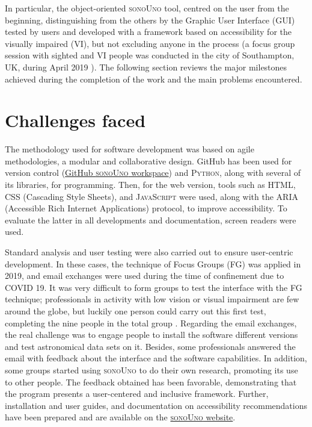 \documentclass[baaa]{baaa}
\begin{document}
In particular, the object-oriented \textsc{sonoUno} tool, centred on the user from the beginning, distinguishing from the others by the Graphic User Interface (GUI) tested by users and developed with a framework based on accessibility for the visually impaired (VI), but not excluding anyone in the process (a focus group session with sighted and VI people was conducted in the city of Southampton, UK, during April 2019 \citep{casadoFG2022}). The following section reviews the major milestones achieved during the completion of the work and the main problems encountered.

\section{Challenges faced}

The methodology used for software development was based on agile methodologies, a modular and collaborative design. GitHub has been used for version control (\href{https://github.com/sonoUnoTeam}{GitHub \textsc{sonoUno} workspace}) and \textsc{Python}, along with several of its libraries, for programming. Then, for the web version, tools such as \textsc{HTML}, \textsc{CSS} (Cascading Style Sheets), and \textsc{JavaScript} were used, along with the \textsc{ARIA} (Accessible Rich Internet Applications) protocol, to improve accessibility. To evaluate the latter in all developments and documentation, screen readers were used.

Standard analysis and user testing were also carried out to ensure user-centric development. In these cases, the technique of Focus Groups (FG) was applied in 2019, and email exchanges were used during the time of confinement due to COVID 19. It was very difficult to form groups to test the interface with the FG technique; professionals in activity with low vision or visual impairment are few around the globe, but luckily one person could carry out this first test, completing the nine people in the total group \citep{casadoFG2022}. Regarding the email exchanges, the real challenge was to engage people to install the software different versions and test astronomical data sets on it. Besides, some professionals answered the email with feedback about the interface and the software capabilities. In addition, some groups started using \textsc{sonoUno} to do their own research, promoting its use to other people. The feedback obtained has been favorable, demonstrating that the program presents a user-centered and inclusive framework. Further, installation and user guides, and documentation on accessibility recommendations have been prepared and are available on the \href{https://reinforce.sonouno.org.ar/}{\textsc{sonoUno} website}.
\end{document}
